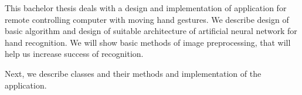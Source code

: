 This bachelor thesis deals with a design and implementation of application for remote controlling computer with moving hand gestures. We describe design of basic algorithm and design of suitable architecture of artificial neural network for hand recognition. We will show basic methods of image preprocessing, that will help us increase success of recognition.

Next, we describe classes and their methods and implementation of the application.
